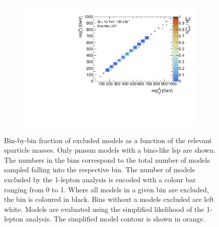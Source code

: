 \begin{figure}
\begin{subfigure}[b]{0.5\linewidth}
		\centering\includegraphics[width=\textwidth]{cut_bino_LSP/mchi1p_mchi20_contour}
		\caption{\label{fig:mchi1p_mchi20_contour_bino_lsp}}
	\end{subfigure}\hfill
	\caption{Bin-by-bin fraction of excluded models as a function of the relevant sparticle masses. Only \gls{pmssm} models with a bino-like \gls{lsp} are shown. The numbers in the bins correspond to the total number of models sampled falling into the respective bin. The number of models excluded by the 1-lepton analysis is encoded with a colour bar ranging from 0 to 1. Where all models in a given bin are excluded, the bin is coloured in black. Bins without a models excluded are left white. Models are evaluated using the simplified likelihood of the 1-lepton analysis. The simplified model contour is shown in orange.}
	\label{fig:impact_electroweakinos_2D_bino_lsp}
\end{figure}

